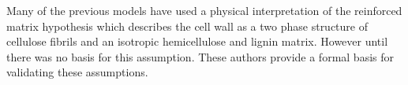 Many of the previous models have used a physical interpretation of the
reinforced matrix hypothesis \cite{Barber_1964} which describes the cell wall
as a two phase structure of cellulose fibrils and an isotropic hemicellulose and
lignin matrix. However until \cite{Yamamoto_2007} there was
no basis for this assumption. These authors provide a formal basis for validating
these assumptions.